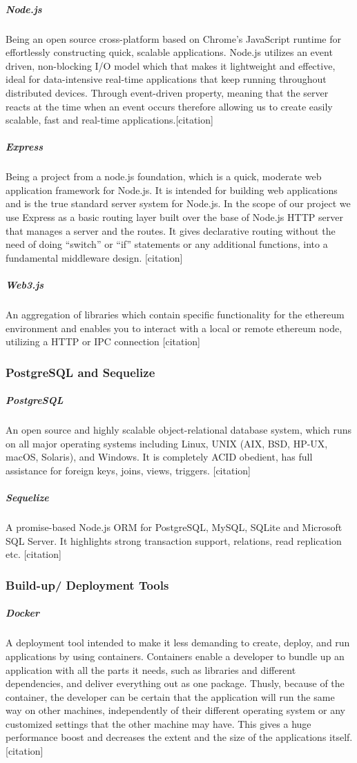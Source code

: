 \subparagraph{Node.js}
Being an open source cross-platform based on Chrome's JavaScript runtime for effortlessly constructing quick, scalable applications. Node.js utilizes an event driven, non-blocking I/O model which that makes it lightweight and effective, ideal for data-intensive real-time applications that keep running throughout distributed devices. Through event-driven property, meaning that the server reacts at the time when an event occurs therefore allowing us to create easily scalable, fast and real-time applications.[citation]

\subparagraph{Express}

Being a project from a node.js foundation, which is a quick, moderate web application framework for Node.js. It is intended for building web applications and is the true standard server system for Node.js. In the scope of our project we use Express as a basic routing layer built over the base of Node.js HTTP server that manages a server and the routes. It gives declarative routing without the need of doing “switch” or “if” statements or any additional functions, into a fundamental middleware design. [citation]

\subparagraph{Web3.js}
An aggregation of libraries which contain specific functionality for the ethereum environment and enables you to interact with a local or remote ethereum node, utilizing a HTTP or IPC connection [citation]



\subsubsection{PostgreSQL and Sequelize}
\subparagraph{PostgreSQL}
An open source and highly scalable object-relational database system, which runs on all major operating systems including Linux, UNIX (AIX, BSD, HP-UX, macOS, Solaris), and Windows. It is completely ACID obedient, has full assistance for foreign keys, joins, views, triggers. [citation]

\subparagraph{Sequelize}
A promise-based Node.js ORM for PostgreSQL, MySQL, SQLite and Microsoft SQL Server. It highlights strong transaction support, relations, read replication etc. [citation]


\subsubsection{Build-up/ Deployment Tools}
\subparagraph{Docker}
A deployment tool intended to make it less demanding to create, deploy, and run applications by using containers. Containers enable a developer to bundle up an application with all the parts it needs, such as libraries and different dependencies, and deliver everything out as one package. Thusly, because of the container, the developer can be certain that the application will run the same way on other machines, independently of their different operating system or any customized settings that the other machine may have. This gives a huge performance boost and decreases the extent and the size of the applications itself. [citation]

